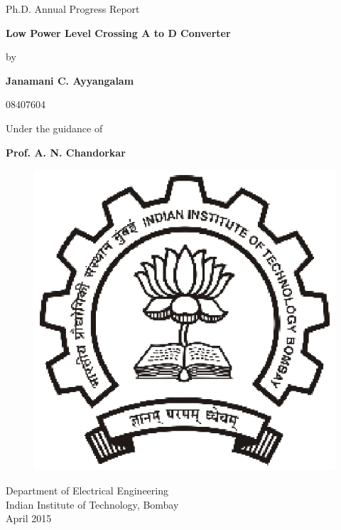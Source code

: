 \documentclass[12pt,oneside]{report}
\begin{document}
\pagestyle{empty}
\begin{center}
{\Large Ph.D. Annual Progress Report}

\vspace{1cm}

{\LARGE \bf Low Power Level Crossing A to D Converter} 
 
\vspace{2.0cm}

by

\vspace{0.5cm}

{\Large \bf Janamani C. Ayyangalam}

\vspace{0.25cm}

08407604

\vspace{1.5cm}

Under the guidance of

\vspace{0.5cm}

{\Large \bf Prof. A. N. Chandorkar}


\begin{figure}[h]
\hspace{1cm}
\vspace{1cm}
\begin{center}
\includegraphics[scale=0.75]{./Figures/IITBombayLogo.ps}
\end{center}
\vspace{1cm}
\end{figure}

Department  of Electrical Engineering \\
\vspace{0.25cm}
Indian Institute of Technology, Bombay\\
\vspace{0.25cm}
April 2015 \\
\vspace {0.5cm}

\end{center}
\end{document}
